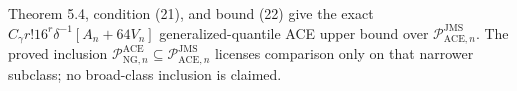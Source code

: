 Theorem 5.4, condition (21), and bound (22) give the exact \(C_{\gamma}r!16^r\delta^{-1}[A_n+64V_n]\) generalized-quantile ACE upper bound over \(\mathcal P_{\mathrm{ACE},n}^{\mathrm{JMS}}\). The proved inclusion \(\mathcal P_{\mathrm{NG},n}^{\mathrm{ACE}}\subseteq\mathcal P_{\mathrm{ACE},n}^{\mathrm{JMS}}\) licenses comparison only on that narrower subclass; no broad-class inclusion is claimed.